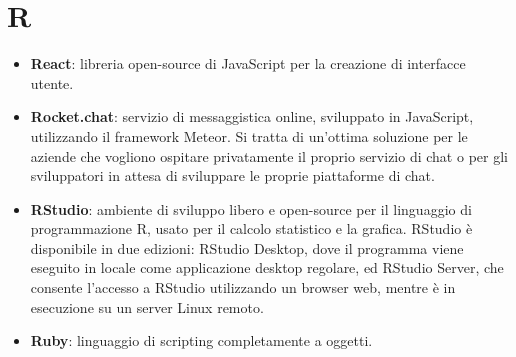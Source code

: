 \newpage
\section{R}

\begin{itemize}
	\item \textbf{React}: libreria open-source di JavaScript per la creazione di interfacce utente.
	\item \textbf{Rocket.chat}: servizio di messaggistica online, sviluppato in JavaScript, utilizzando il framework Meteor. Si tratta di un'ottima soluzione per le aziende che vogliono ospitare privatamente il proprio servizio di chat o per gli sviluppatori in attesa di sviluppare le proprie piattaforme di chat.
	\item \textbf{RStudio}: ambiente di sviluppo libero e open-source per il linguaggio di programmazione R, usato per il calcolo statistico e la grafica. RStudio è disponibile in due edizioni: RStudio Desktop, dove il programma viene eseguito in locale come applicazione desktop regolare, ed RStudio Server, che consente l'accesso a RStudio utilizzando un browser web, mentre è in esecuzione su un server Linux remoto.
	\item \textbf{Ruby}: linguaggio di scripting completamente a oggetti.
\end{itemize}
